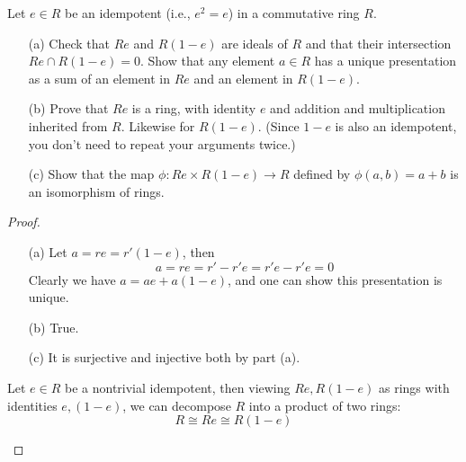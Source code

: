 \documentclass[openany]{book}
\begin{document}
\begin{prob}[Q7]
    Let \( e \in R \) be an idempotent (i.e., \( e^2 = e \)) in a commutative ring \( R \).

\begin{enumerate}
    \item[(a)] Check that \( Re \) and \( R(1 - e) \) are ideals of \( R \) and that their intersection \( Re \cap R(1 - e) = 0 \). Show that any element \( a \in R \) has a unique presentation as a sum of an element in \( Re \) and an element in \( R(1 - e) \).

    \item[(b)] Prove that \( Re \) is a ring, with identity \( e \) and addition and multiplication inherited from \( R \). Likewise for \( R(1 - e) \). (Since \( 1 - e \) is also an idempotent, you don't need to repeat your arguments twice.)

    \item[(c)] Show that the map \( \phi: Re \times R(1 - e) \to R \) defined by \( \phi(a, b) = a + b \) is an isomorphism of rings.
\end{enumerate}
\end{prob}
\begin{proof}
    \begin{enumerate}
        \item[(a)] Let $a=re=r'(1-e)$, then 
        \begin{equation*}
            a=re=r'-r'e=r'e-r'e=0
        \end{equation*}
        Clearly we have $a=ae+a(1-e)$, and one can show this presentation is unique.
        \item[(b)] True.
        \item[(c)] It is surjective and injective both by part (a). 
    \end{enumerate}
    \begin{prop}
        Let $e\in R$ be a nontrivial idempotent, then viewing $Re, R(1-e)$ as rings with identities $e, (1-e)$, we can decompose $R$ into a product of two rings:
        \begin{equation*}
            R\cong Re\cong R(1-e)
        \end{equation*}
    \end{prop}
\end{proof}
\end{document}
